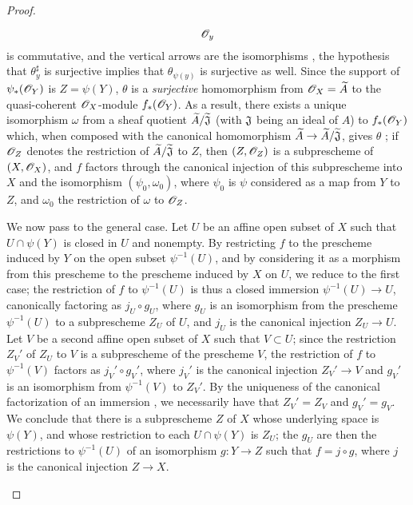 \begin{proof}
\begin{enumerate}[label=(\alph*)]
\[{        \mathscr{O}_y
      }
    \]
    is commutative, and the vertical arrows are the isomorphisms , the hypothesis that $\theta_y^\sharp$ is surjective implies that $\theta_{\psi(y)}$ is surjective as well.
    Since the support of $\psi_*(\mathscr{O}_Y)$ is $Z=\psi(Y)$, $\theta$ is a \emph{surjective} homomorphism from $\mathscr{O}_X={\widetilde{A}}$ to the quasi-coherent $\mathscr{O}_X$-module $f_*(\mathscr{O}_Y)$.
    As a result, there exists a unique isomorphism $\omega$ from a sheaf quotient ${\widetilde{A}}/{\widetilde{\mathfrak{J}}}$ (with $\mathfrak{J}$ being an ideal of $A$) to $f_*(\mathscr{O}_Y)$ which, when composed with the canonical homomorphism $\wt{A}\to\wt{A}/\wt{\fk{J}}$, gives $\theta$ ;
    if $\mathscr{O}_Z$ denotes the restriction of ${\widetilde{A}}/{\widetilde{\mathfrak{J}}}$ to $Z$, then $(Z,\mathscr{O}_Z)$ is a subprescheme of $(X,\mathscr{O}_X)$, and $f$ factors through the canonical injection of this subprescheme into $X$ and the isomorphism $(\psi_0,\omega_0)$, where $\psi_0$ is $\psi$ considered as a map from $Y$ to $Z$, and $\omega_0$ the restriction of $\omega$ to $\mathscr{O}_Z$.

    We now pass to the general case.
    Let $U$ be an affine open subset of $X$ such that $U\cap\psi(Y)$ is closed in $U$ and nonempty.
    By restricting $f$ to the prescheme induced by $Y$ on the open subset $\psi^{-1}(U)$, and by considering it as a morphism from this prescheme to the prescheme induced by $X$ on $U$, we reduce to the first case;
    the restriction of $f$ to $\psi^{-1}(U)$ is thus a closed immersion $\psi^{-1}(U)\to U$, canonically factoring as $j_U\circ g_U$, where $g_U$ is an isomorphism from the prescheme $\psi^{-1}(U)$ to a subprescheme $Z_U$ of $U$, and $j_U$ is the canonical injection $Z_U\to U$.
    Let $V$ be a second affine open subset of $X$ such that $V\subset U$;
    since the restriction $Z_V'$ of $Z_U$ to $V$ is a subprescheme of the prescheme $V$, the restriction of $f$ to $\psi^{-1}(V)$ factors as $j_V'\circ g_V'$, where $j_V'$ is the canonical injection $Z_V'\to V$ and $g_V'$ is an isomorphism from $\psi^{-1}(V)$ to $Z_V'$.
    By the uniqueness of the canonical factorization of an immersion , we necessarily have that $Z_V'=Z_V$ and $g_V'=g_V$.
    We conclude  that there is a subprescheme $Z$ of $X$ whose underlying space is $\psi(Y)$, and whose restriction to each $U\cap\psi(Y)$ is $Z_U$;
    the $g_U$ are then the restrictions to $\psi^{-1}(U)$ of an isomorphism $g:Y\to Z$ such that $f=j\circ g$, where $j$ is the canonical injection $Z\to X$.
\end{enumerate}
\end{proof}

